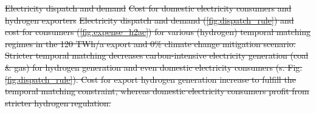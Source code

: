 \documentclass[5p,numafflabel]{elsarticle}
\newcommand{\co}{\ce{CO2}~}
\def\co{CO${}_2${\:}}
\providecommand{\DIFdeltex}[1]{{\protect\color{red}\sout{#1}}}                      %
\providecommand{\DIFdelbegin}{} %
\providecommand{\DIFdelend}{} %
\providecommand{\DIFdelFL}[1]{\DIFdel{#1}} %
\providecommand{\DIFdel}[1]{\texorpdfstring{\DIFdeltex{#1}}{}} %
\newcommand{\DIFscaledelfig}{0.5}
\newlength{\DIFdelgraphicswidth} %
\newlength{\DIFdelgraphicsheight} %
\newcommand{\DIFdelincludegraphics}[2][]{%
\sbox{\DIFdelgraphicsbox}{\DIFOincludegraphics[#1]{#2}}%
\settoboxwidth{\DIFdelgraphicswidth}{\DIFdelgraphicsbox} %
\settoboxtotalheight{\DIFdelgraphicsheight}{\DIFdelgraphicsbox} %
\scalebox{\DIFscaledelfig}{%
\parbox[b]{\DIFdelgraphicswidth}{\usebox{\DIFdelgraphicsbox}\\[-\baselineskip] \rule{\DIFdelgraphicswidth}{0em}}\llap{\resizebox{\DIFdelgraphicswidth}{\DIFdelgraphicsheight}{%
\setlength{\unitlength}{\DIFdelgraphicswidth}%
\begin{picture}(1,1)%
\thicklines\linethickness{2pt} %
{\color[rgb]{1,0,0}\put(0,0){\framebox(1,1){}}}%
{\color[rgb]{1,0,0}\put(0,0){\line( 1,1){1}}}%
{\color[rgb]{1,0,0}\put(0,1){\line(1,-1){1}}}%
\end{picture}%
}\hspace*{3pt}}} %
} %
\DeclareRobustCommand{\DIFdelbegin}{\DIFOdelbegin \let\includegraphics\DIFdelincludegraphics} %
\DeclareRobustCommand{\DIFdelend}{\DIFOaddend \let\includegraphics\DIFOincludegraphics} %
\begin{document}
\DIFdelbegin %
{%
\DIFdelFL{Electricity dispatch and demand}}
{%
\DIFdelFL{Cost for domestic electricity consumers and hydrogen exporters}}
{%
\DIFdelFL{Electricity dispatch and demand (\ref{fig:dispatch_rule}) and cost for consumers (\ref{fig:expense_h2ac}) for various (hydrogen) temporal matching regimes in the 120 TWh/a export and 0\% climate change mitigation scenario. Stricter temporal matching decreases carbon-intensive electricity generation (coal \& gas) for hydrogen generation and even domestic electricity consumers (s. Fig. \ref{fig:dispatch_rule}). Cost for export hydrogen generation increase to fulfill the temporal matching constraint, whereas domestic electricity consumers profit from stricter hydrogen regulation.}}
\DIFdelend %
\end{document}
